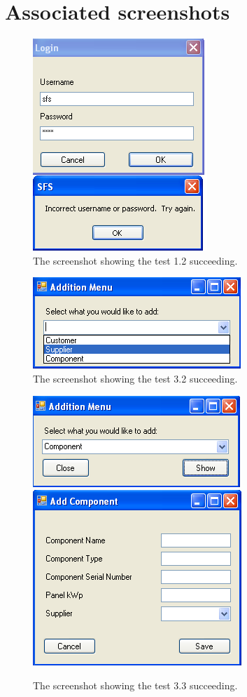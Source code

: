 \section{Associated screenshots}

\begin{figure}[ht]
\centering
\includegraphics[scale=0.5]{test1dot2scrot}
\caption{The screenshot showing the test 1.2 succeeding.}
\label{fig:test_onedottwo}
\end{figure}

\begin{figure}[ht]
\centering
\includegraphics[scale=0.5]{test3dot2scrot}
\caption{The screenshot showing the test 3.2 succeeding.}
\label{fig:test_threedottwo}
\end{figure}

\begin{figure}[ht]
\centering
\includegraphics[scale=0.5]{test3dot3scrot1}
\includegraphics[scale=0.5]{test3dot3scrot2}
\caption{The screenshot showing the test 3.3 succeeding.}
\label{fig:test_threedotthree}
\end{figure}

